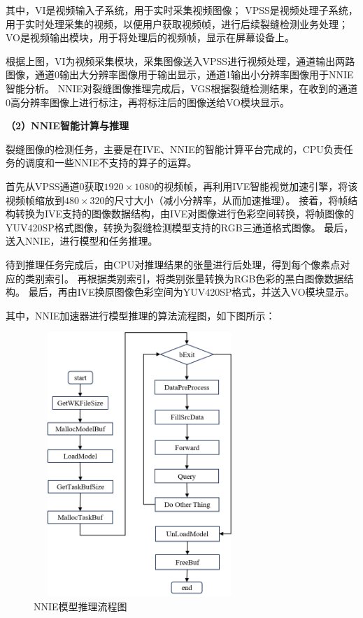 其中，VI是视频输入子系统，用于实时采集视频图像；
VPSS是视频处理子系统，用于实时处理采集的视频，以便用户获取视频帧，进行后续裂缝检测业务处理；
VO是视频输出模块，用于将处理后的视频帧，显示在屏幕设备上。

根据上图，VI为视频采集模块，采集图像送入VPSS进行视频处理，通道输出两路图像，通道0输出大分辨率图像用于输出显示，通道1输出小分辨率图像用于NNIE智能分析。
NNIE对裂缝图像推理完成后，VGS根据裂缝检测结果，在收到的通道0高分辨率图像上进行标注，再将标注后的图像送给VO模块显示。

\textbf{（2）NNIE智能计算与推理}

裂缝图像的检测任务，主要是在IVE、NNIE的智能计算平台完成的，CPU负责任务的调度和一些NNIE不支持的算子的运算。

首先从VPSS通道0获取$1920\times1080$的视频帧，再利用IVE智能视觉加速引擎，将该视频帧缩放到$480\times320$的尺寸大小（减小分辨率，从而加速推理）。
接着，将帧结构转换为IVE支持的图像数据结构，由IVE对图像进行色彩空间转换，将帧图像的YUV420SP格式图像，转换为裂缝检测模型支持的RGB三通道格式图像。
最后，送入NNIE，进行模型和任务推理。

待到推理任务完成后，由CPU对推理结果的张量进行后处理，得到每个像素点对应的类别索引。
再根据类别索引，将类别张量转换为RGB色彩的黑白图像数据结构。
最后，再由IVE换原图像色彩空间为YUV420SP格式，并送入VO模块显示。

其中，NNIE加速器进行模型推理的算法流程图，如下图所示：

\begin{figure}[H]
    \label{nnie-flow}
    \includegraphics[width=8cm, height=10cm]{pic/nnie-flow-figure.png}
    \caption{NNIE模型推理流程图}
\end{figure}

